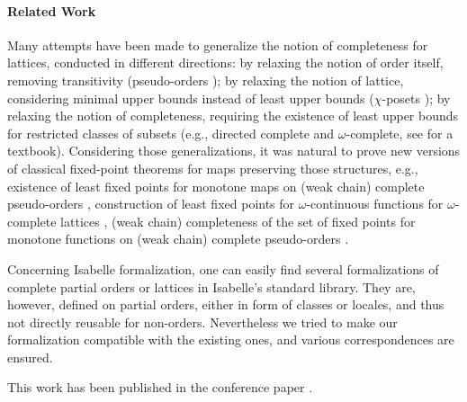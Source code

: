 \documentclass[11pt,a4paper]{article}
\begin{document}
\paragraph*{Related Work}
Many attempts have been made to generalize the notion of completeness for lattices, conducted in different directions: by relaxing the notion of order itself, removing transitivity (pseudo-orders \cite{trellis}); by relaxing the notion of lattice, considering minimal upper bounds instead of least upper bounds ($\chi$-posets \cite{LN83}); by relaxing the notion of completeness, requiring the existence of least upper bounds for restricted classes of subsets (e.g., directed complete and $\omega$-complete, see \cite{davey02} for a textbook). Considering those generalizations, it was natural to prove new versions of classical fixed-point theorems for maps preserving those structures, e.g., existence of least fixed points for monotone maps on (weak chain) complete pseudo-orders \cite{Bhatta05, SM13}, construction of least fixed points for $\omega$-continuous functions for $\omega$-complete lattices \cite{mashburn83}, (weak chain) completeness of the set of fixed points for monotone functions on (weak chain) complete pseudo-orders \cite{PG11}.

Concerning Isabelle formalization,
one can easily find several formalizations of complete partial orders or lattices in Isabelle's standard library.
They are, however, defined on partial orders, either in form of classes or locales,
and thus not directly reusable for non-orders.
Nevertheless we tried to make our formalization compatible with the existing ones,
and various correspondences are ensured.

This work has been published in the conference paper \cite{YamadaD2019}.





\end{document}
